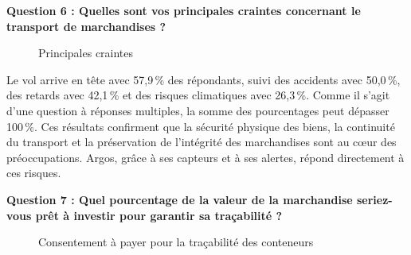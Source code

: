 \textbf{Question 6 : Quelles sont vos principales craintes concernant le transport de marchandises ?}

\begin{figure}[H]
	\centering
	\caption{Principales craintes}
	\label{fig:craintes}
    \tablesourcepromoteurs

\end{figure}

Le vol arrive en tête avec 57,9\,\% des répondants, suivi des accidents avec 50,0\,\%, des retards avec 42,1\,\% et des risques climatiques avec 26,3\,\%. Comme il s’agit d’une question à réponses multiples, la somme des pourcentages peut dépasser 100\,\%. Ces résultats confirment que la sécurité physique des biens, la continuité du transport et la préservation de l’intégrité des marchandises sont au cœur des préoccupations. Argos, grâce à ses capteurs et à ses alertes, répond directement à ces risques.

\textbf{Question 7 : Quel pourcentage de la valeur de la marchandise seriez-vous prêt à investir pour garantir sa traçabilité ?}

\begin{figure}[H]
    \centering
    \caption{Consentement à payer pour la traçabilité des conteneurs}
    \label{fig:consentement_prix}
    \tablesourcepromoteurs
\end{figure}

